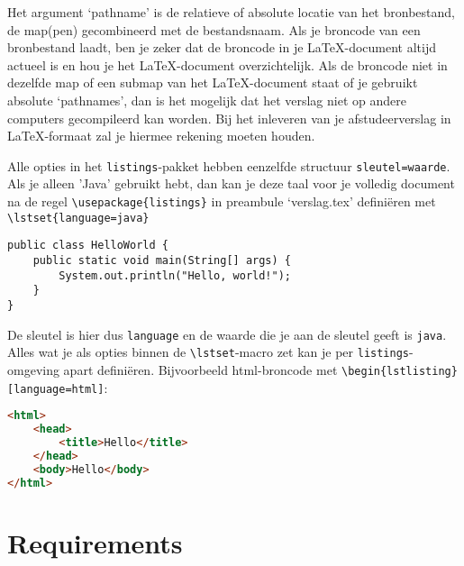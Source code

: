 Het argument `pathname' is de relatieve of absolute locatie van het
bronbestand, de map(pen) gecombineerd met de bestandsnaam. Als je
broncode van een bronbestand laadt, ben je zeker dat de broncode in je
\LaTeX{}-document altijd actueel is en hou je het \LaTeX{}-document
overzichtelijk. Als de broncode niet in dezelfde map of een submap van
het \LaTeX{}-document staat of je gebruikt absolute `pathnames', dan
is het mogelijk dat het verslag niet op andere computers gecompileerd
kan worden. Bij het inleveren van je afstudeerverslag in
\LaTeX{}-formaat zal je hiermee rekening moeten houden.


Alle opties in het \verb!listings!-pakket hebben eenzelfde structuur
\verb!sleutel=waarde!. Als je alleen 'Java' gebruikt hebt, dan kan je
deze taal voor je volledig document na de regel
\verb!\usepackage{listings}! in preambule `verslag.tex' definiëren met
\verb!\lstset{language=java}!

\lstset{language=java}

\begin{Aanpassen}
\begin{lstlisting}
public class HelloWorld {
    public static void main(String[] args) {
        System.out.println("Hello, world!");
    }
}
\end{lstlisting}
\end{Aanpassen}


De sleutel is hier dus \verb!language! en de waarde die je aan de
sleutel geeft is \verb!java!. Alles wat je als opties binnen de
\verb!\lstset!-macro zet kan je per \verb!listings!-omgeving apart
definiëren. Bijvoorbeeld html-broncode met
\verb!\begin{lstlisting}[language=html]!:

\begin{Aanpassen}
\begin{lstlisting}[language=html]
<html>
    <head>
        <title>Hello</title>
    </head>
    <body>Hello</body>
</html>
\end{lstlisting}
\end{Aanpassen}







\newpage
{}

\label{appendix}
\thispagestyle{myheadings}

\section{Requirements}
